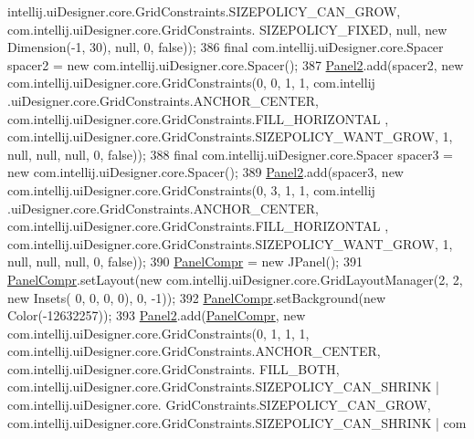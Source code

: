 \begin{DoxyCode}
      intellij.uiDesigner.core.GridConstraints.SIZEPOLICY\_CAN\_GROW, com.intellij.uiDesigner.core.GridConstraints.
      SIZEPOLICY\_FIXED, null, \textcolor{keyword}{new} Dimension(-1, 30), null, 0, \textcolor{keyword}{false}));
386         \textcolor{keyword}{final} com.intellij.uiDesigner.core.Spacer spacer2 = \textcolor{keyword}{new} com.intellij.uiDesigner.core.Spacer();
387         \hyperlink{classpresentacion_1_1form_1_1mainForm_a40e87b5e341114287b070012a4aadc8f}{Panel2}.add(spacer2, \textcolor{keyword}{new} com.intellij.uiDesigner.core.GridConstraints(0, 0, 1, 1, com.intellij
      .uiDesigner.core.GridConstraints.ANCHOR\_CENTER, com.intellij.uiDesigner.core.GridConstraints.FILL\_HORIZONTAL
      , com.intellij.uiDesigner.core.GridConstraints.SIZEPOLICY\_WANT\_GROW, 1, null, null, null, 0, \textcolor{keyword}{false}));
388         \textcolor{keyword}{final} com.intellij.uiDesigner.core.Spacer spacer3 = \textcolor{keyword}{new} com.intellij.uiDesigner.core.Spacer();
389         \hyperlink{classpresentacion_1_1form_1_1mainForm_a40e87b5e341114287b070012a4aadc8f}{Panel2}.add(spacer3, \textcolor{keyword}{new} com.intellij.uiDesigner.core.GridConstraints(0, 3, 1, 1, com.intellij
      .uiDesigner.core.GridConstraints.ANCHOR\_CENTER, com.intellij.uiDesigner.core.GridConstraints.FILL\_HORIZONTAL
      , com.intellij.uiDesigner.core.GridConstraints.SIZEPOLICY\_WANT\_GROW, 1, null, null, null, 0, \textcolor{keyword}{false}));
390         \hyperlink{classpresentacion_1_1form_1_1mainForm_a2d0f3d20d2a80c16321aaccbc273279d}{PanelCompr} = \textcolor{keyword}{new} JPanel();
391         \hyperlink{classpresentacion_1_1form_1_1mainForm_a2d0f3d20d2a80c16321aaccbc273279d}{PanelCompr}.setLayout(\textcolor{keyword}{new} com.intellij.uiDesigner.core.GridLayoutManager(2, 2, \textcolor{keyword}{new} Insets(
      0, 0, 0, 0), 0, -1));
392         \hyperlink{classpresentacion_1_1form_1_1mainForm_a2d0f3d20d2a80c16321aaccbc273279d}{PanelCompr}.setBackground(\textcolor{keyword}{new} Color(-12632257));
393         \hyperlink{classpresentacion_1_1form_1_1mainForm_a40e87b5e341114287b070012a4aadc8f}{Panel2}.add(\hyperlink{classpresentacion_1_1form_1_1mainForm_a2d0f3d20d2a80c16321aaccbc273279d}{PanelCompr}, \textcolor{keyword}{new} com.intellij.uiDesigner.core.GridConstraints(0, 1, 1, 1,
       com.intellij.uiDesigner.core.GridConstraints.ANCHOR\_CENTER, com.intellij.uiDesigner.core.GridConstraints.
      FILL\_BOTH, com.intellij.uiDesigner.core.GridConstraints.SIZEPOLICY\_CAN\_SHRINK | com.intellij.uiDesigner.core.
      GridConstraints.SIZEPOLICY\_CAN\_GROW, com.intellij.uiDesigner.core.GridConstraints.SIZEPOLICY\_CAN\_SHRINK | com

\end{DoxyCode}
